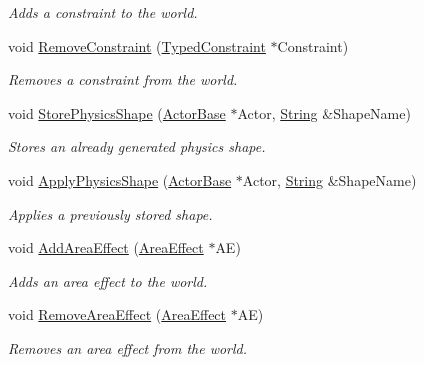 \begin{DoxyCompactItemize}
\begin{DoxyCompactList}\small\item\em Adds a constraint to the world. \item\end{DoxyCompactList}\item 
void \hyperlink{classphys_1_1PhysicsManager_ace94aa20b5191b01630e7a5046cb7af6}{RemoveConstraint} (\hyperlink{classphys_1_1TypedConstraint}{TypedConstraint} $\ast$Constraint)
\begin{DoxyCompactList}\small\item\em Removes a constraint from the world. \item\end{DoxyCompactList}\item 
void \hyperlink{classphys_1_1PhysicsManager_a24fae734b5750db6fc1d2b1e3656bb71}{StorePhysicsShape} (\hyperlink{classphys_1_1ActorBase}{ActorBase} $\ast$Actor, \hyperlink{namespacephys_aa03900411993de7fbfec4789bc1d392e}{String} \&ShapeName)
\begin{DoxyCompactList}\small\item\em Stores an already generated physics shape. \item\end{DoxyCompactList}\item 
void \hyperlink{classphys_1_1PhysicsManager_a58653c59133900a432169a7c980105ce}{ApplyPhysicsShape} (\hyperlink{classphys_1_1ActorBase}{ActorBase} $\ast$Actor, \hyperlink{namespacephys_aa03900411993de7fbfec4789bc1d392e}{String} \&ShapeName)
\begin{DoxyCompactList}\small\item\em Applies a previously stored shape. \item\end{DoxyCompactList}\item 
void \hyperlink{classphys_1_1PhysicsManager_a64e75a71598b6440c4feb1a2214a1420}{AddAreaEffect} (\hyperlink{classphys_1_1AreaEffect}{AreaEffect} $\ast$AE)
\begin{DoxyCompactList}\small\item\em Adds an area effect to the world. \item\end{DoxyCompactList}\item 
void \hyperlink{classphys_1_1PhysicsManager_a5ee0f784a8239be56164a7a67a28f227}{RemoveAreaEffect} (\hyperlink{classphys_1_1AreaEffect}{AreaEffect} $\ast$AE)
\begin{DoxyCompactList}\small\item\em Removes an area effect from the world. \item\end{DoxyCompactList}\item 

\end{DoxyCompactItemize}
